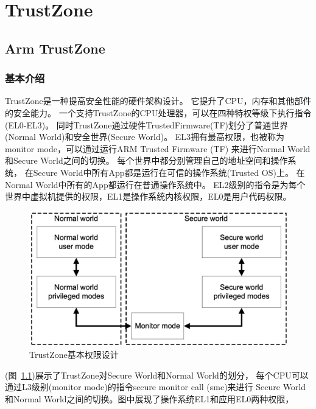 
\chapter{TrustZone} %

\label{Chapter2} %


%



\section{Arm TrustZone}

\subsection{基本介绍} 
TrustZone是一种提高安全性能的硬件架构设计\cite{trustZone-p1}。
它提升了CPU，内存和其他部件的安全能力。
一个支持TrustZone的CPU处理器，可以在四种特权等级下执行指令(EL0-EL3)\cite{trustZone-p2}。
同时TrustZone通过硬件TrustedFirmware(TF)划分了普通世界(Normal World)和安全世界(Secure World)。
EL3拥有最高权限，也被称为monitor mode，可以通过运行ARM Trusted Firmware (TF) 来进行Normal World和Secure World之间的切换。
每个世界中都分别管理自己的地址空间和操作系统\cite{trustZone-p2}，
在Secure World中所有App都是运行在可信的操作系统(Trusted OS)上。
在Normal World中所有的App都运行在普通操作系统中。
EL2级别的指令是为每个世界中虚拟机提供的权限，EL1是操作系统内核权限，EL0是用户代码权限。


\begin{figure}
    \centering
    \includegraphics[scale=0.45]{Figures/trustzone/trustzone.png}
    \decoRule
    \caption{TrustZone基本权限设计}
    \label{fig:trustzone}
\end{figure}
(图~\ref{fig:trustzone})展示了TrustZone对Secure World和Normal World的划分\cite{trustZone-p5}，
每个CPU可以通过L3级别(monitor mode)的指令secure monitor call (smc)来进行
Secure World和Normal World之间的切换。图中展现了操作系统EL1和应用EL0两种权限，


